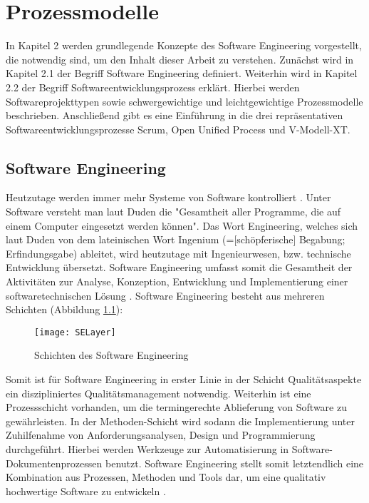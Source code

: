 \chapter{Prozessmodelle}\label{sec:chapter2}

In Kapitel 2 werden grundlegende Konzepte des Software Engineering vorgestellt, die notwendig sind, um den Inhalt dieser Arbeit zu verstehen. Zunächst wird in Kapitel 2.1 der Begriff Software Engineering definiert. Weiterhin wird in Kapitel 2.2 der Begriff Softwareentwicklungsprozess erklärt. Hierbei werden Softwareprojekttypen sowie schwergewichtige und leichtgewichtige Prozessmodelle beschrieben. Anschließend gibt es eine Einführung in die drei repräsentativen Softwareentwicklungsprozesse Scrum, Open Unified Process und V-Modell-XT.

\section{Software Engineering}\label{sec:chapter2: Software Engineering}
Heutzutage werden immer mehr Systeme von Software kontrolliert \cite{Puntambekar2007}. Unter Software versteht man laut Duden die "Gesamtheit aller Programme, die auf einem Computer eingesetzt werden können". Das Wort Engineering, welches sich laut Duden von dem lateinischen Wort Ingenium (=[schöpferische] Begabung; Erfindungsgabe) ableitet, wird heutzutage mit Ingenieurwesen, bzw. technische Entwicklung übersetzt. Software Engineering umfasst somit die Gesamtheit der Aktivitäten zur Analyse, Konzeption, Entwicklung und Implementierung einer softwaretechnischen Lösung \cite{Specker1998}.
Software Engineering besteht aus mehreren Schichten (Abbildung \ref{fig:SchichtenSE}):

\begin{figure}[htp]
\begin{center}
  \texttt{[image: SELayer]} %
  \caption{Schichten des Software Engineering \cite{Puntambekar2007}}
  \label{fig:SchichtenSE}
\end{center}
\end{figure}

Somit ist für Software Engineering in erster Linie in der Schicht Qualitätsaspekte ein diszipliniertes Qualitätsmanagement notwendig. Weiterhin ist eine Prozessschicht vorhanden, um die termingerechte Ablieferung von Software zu gewährleisten. In der Methoden-Schicht wird sodann die Implementierung unter Zuhilfenahme von Anforderungsanalysen, Design und Programmierung durchgeführt. Hierbei werden Werkzeuge zur Automatisierung in Software- Dokumentenprozessen benutzt. Software Engineering stellt somit letztendlich eine Kombination aus Prozessen, Methoden und Tools dar, um eine qualitativ hochwertige Software zu entwickeln \cite{Puntambekar2007}.

